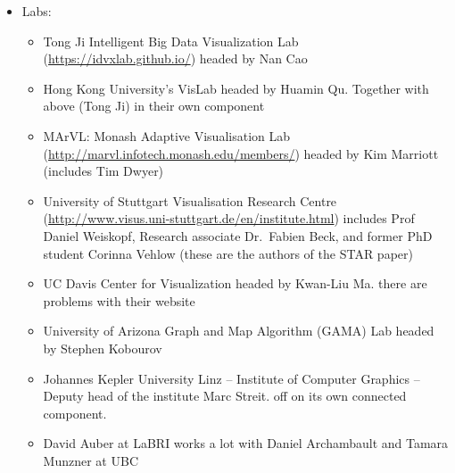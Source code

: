 \begin{itemize}
\tightlist
\item
  Labs:

  \begin{itemize}
  \tightlist
  \item
    Tong Ji Intelligent Big Data Visualization Lab
    (\url{https://idvxlab.github.io/}) headed by Nan Cao
  \item
    Hong Kong University's VisLab headed by Huamin Qu. Together with
    above (Tong Ji) in their own component
  \item
    MArVL: Monash Adaptive Visualisation Lab
    (\url{http://marvl.infotech.monash.edu/members/}) headed by Kim
    Marriott (includes Tim Dwyer)
  \item
    University of Stuttgart Visualisation Research Centre
    (\url{http://www.visus.uni-stuttgart.de/en/institute.html}) includes
    Prof Daniel Weiskopf, Research associate Dr.~Fabien Beck, and former
    PhD student Corinna Vehlow (these are the authors of the STAR paper)
  \item
    UC Davis Center for Visualization headed by Kwan-Liu Ma. there are
    problems with their website
  \item
    University of Arizona Graph and Map Algorithm (GAMA) Lab headed by
    Stephen Kobourov
  \item
    Johannes Kepler University Linz -- Institute of Computer Graphics --
    Deputy head of the institute Marc Streit. off on its own connected
    component.
  \item
    David Auber at LaBRI works a lot with Daniel Archambault and Tamara
    Munzner at UBC
  \end{itemize}
\end{itemize}

